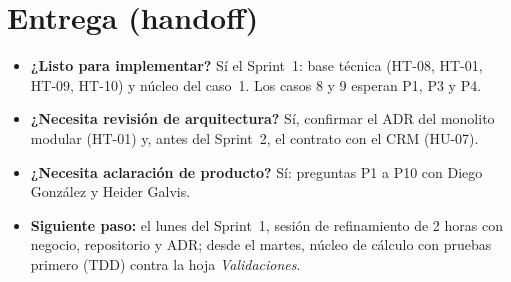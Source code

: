 \documentclass[11pt,a4paper]{article}
\begin{document}
\section{Entrega (handoff)}
\begin{itemize}
  \item \textbf{¿Listo para implementar?} Sí el Sprint~1: base técnica (HT-08, HT-01, HT-09, HT-10) y núcleo del caso~1. Los casos 8 y 9 esperan P1, P3 y P4.
  \item \textbf{¿Necesita revisión de arquitectura?} Sí, confirmar el ADR del monolito modular (HT-01) y, antes del Sprint~2, el contrato con el CRM (HU-07).
  \item \textbf{¿Necesita aclaración de producto?} Sí: preguntas P1 a P10 con Diego González y Heider Galvis.
  \item \textbf{Siguiente paso:} el lunes del Sprint~1, sesión de refinamiento de 2 horas con negocio,
        repositorio y ADR; desde el martes, núcleo de cálculo con pruebas primero (TDD) contra la hoja \textit{Validaciones}.
\end{itemize}
\end{document}
